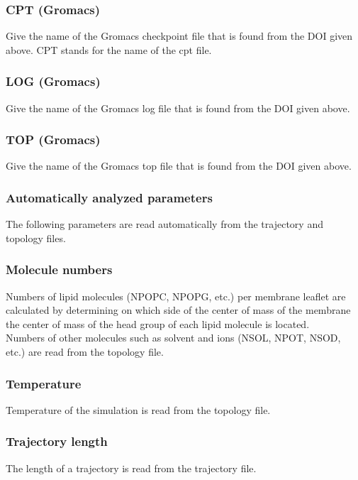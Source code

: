 \documentclass[fleqn,10pt]{wlscirep}
\begin{document}
\subsubsection*{CPT (Gromacs)}
Give the name of the Gromacs checkpoint file that is found from the DOI given above.
CPT stands for the name of the cpt file. 

\subsubsection*{LOG (Gromacs)}
Give the name of the Gromacs log file that is found from the DOI given above.

\subsubsection*{TOP (Gromacs)}
Give the name of the Gromacs top file that is found from the DOI given above.



\subsubsection{Automatically analyzed parameters}
The following parameters are read automatically from the trajectory and topology files.
\subsubsection*{Molecule numbers}
Numbers of lipid molecules (NPOPC, NPOPG, etc.) per membrane leaflet are calculated by determining on which side of the center of mass of the membrane the center of mass of the head group of each lipid molecule is located.
\newline \\
\noindent Numbers of other molecules such as solvent and ions (NSOL, NPOT, NSOD, etc.) are read from the topology file.

\subsubsection*{Temperature}
Temperature of the simulation is read from the topology file.

\subsubsection*{Trajectory length}
The length of a trajectory is read from the trajectory file.
\end{document}
